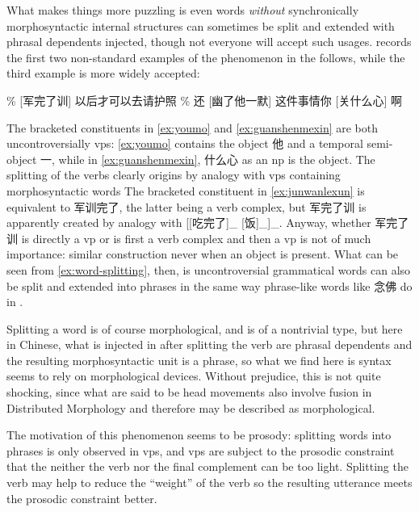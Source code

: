\documentclass[UTF8, a4paper, oneside, scheme=plain]{ctexart}
\newcommand*{\citesec}[1]{\S~{#1}}
\begin{document}
What makes things more puzzling is even words \emph{without} synchronically morphosyntactic internal structures 
can sometimes be split and extended
with phrasal dependents injected,
though not everyone will accept such usages.
\citet[\citesec{6.5.8}]{chao1965grammar} records the first two non-standard examples of the phenomenon
in the follows,
while the third example is more widely accepted:
\begin{exe}
    \ex\label{ex:word-splitting} \begin{xlist}
        \ex\label{ex:junwanlexun} \% [军完了训] 以后才可以去请护照
        \ex\label{ex:youmo} \% 还 [幽了他一默]
        \ex\label{ex:guanshenmexin} 这件事情你 [关什么心] 啊
    \end{xlist}
\end{exe}
The bracketed constituents in \eqref{ex:youmo} and \eqref{ex:guanshenmexin} 
are both uncontroversially \acs{vp}s:
\eqref{ex:youmo} contains the object 他 and a temporal semi-object 一, %
while in \eqref{ex:guanshenmexin}, 什么心 as an \ac{np} is the object.
The splitting of the verbs clearly origins 
by analogy with \ac{vp}s containing morphosyntactic words 
The bracketed constituent in \eqref{ex:junwanlexun} is equivalent to 军训完了,
the latter being a verb complex, %
but 军完了训 is apparently created by analogy with 
[[吃完了]_{} [饭]_{}]_{}.
Anyway, whether 军完了训 is directly a \ac{vp} or is first a verb complex 
and then a \ac{vp} is not of much importance:
similar construction never when an object is present.
What can be seen from \eqref{ex:word-splitting}, then, 
is uncontroversial grammatical words can also be split and extended into phrases 
in the same way phrase-like words like 念佛 do in .

Splitting a word is of course morphological,
and is of a nontrivial type,
but here in Chinese, what is injected in after splitting the verb are phrasal dependents 
and the resulting morphosyntactic unit is a phrase,
so what we find here is syntax seems to rely on morphological devices.
Without prejudice, this is not quite shocking,
since what are said to be head movements 
also involve fusion in Distributed Morphology 
and therefore may be described as morphological.

The motivation of this phenomenon seems to be prosody: 
splitting words into phrases is only observed in \ac{vp}s,
and \ac{vp}s are subject to the prosodic constraint 
that the neither the verb nor the final complement can be too light.
Splitting the verb may help to reduce the ``weight'' of the verb 
so the resulting utterance meets the prosodic constraint better.
\end{document}
